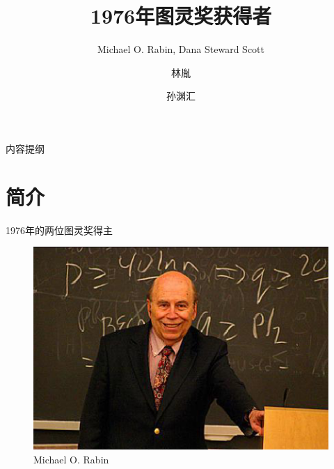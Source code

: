 \documentclass{beamer}
\title[图灵奖获得者介绍] %
{1976年图灵奖获得者}
\subtitle
{Michael O. Rabin,  Dana Steward Scott}
\author%
{林胤\and 孙渊汇}
\institute
{
  同济大学电子与信息学院
}
\begin{document}
\begin{frame}
  \titlepage %
\end{frame}
\begin{frame}{内容提纲}
	\begin{multicols}{2}
		\setlength{\parskip}{0.5em}{\tableofcontents}
	\end{multicols}
\end{frame}

\section{简介}
\begin{frame}{1976年的两位图灵奖得主}
	\begin{figure}[htbp]
		\begin{minipage}{0.4\textwidth}
			\centering\includegraphics[scale=0.3]{figures/lb2.eps}
			\caption*{Michael O. Rabin}
		\end{minipage}
		\begin{minipage}{0.4\textwidth}

\end{minipage}
\end{figure}
\end{frame}
\end{document}
